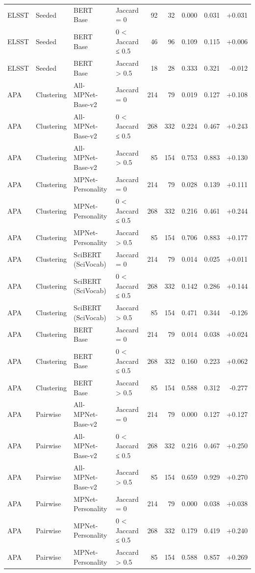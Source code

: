 \begin{table}[ht]
\begin{tabular}{llllrrrrr}
ELSST & Seeded & BERT Base & Jaccard = 0 & 92 & 32 & 0.000 & 0.031 & +0.031 \\
ELSST & Seeded & BERT Base & 0 < Jaccard ≤ 0.5 & 46 & 96 & 0.109 & 0.115 & +0.006 \\
ELSST & Seeded & BERT Base & Jaccard > 0.5 & 18 & 28 & 0.333 & 0.321 & -0.012 \\
APA & Clustering & All-MPNet-Base-v2 & Jaccard = 0 & 214 & 79 & 0.019 & 0.127 & +0.108 \\
APA & Clustering & All-MPNet-Base-v2 & 0 < Jaccard ≤ 0.5 & 268 & 332 & 0.224 & 0.467 & +0.243 \\
APA & Clustering & All-MPNet-Base-v2 & Jaccard > 0.5 & 85 & 154 & 0.753 & 0.883 & +0.130 \\
APA & Clustering & MPNet-Personality & Jaccard = 0 & 214 & 79 & 0.028 & 0.139 & +0.111 \\
APA & Clustering & MPNet-Personality & 0 < Jaccard ≤ 0.5 & 268 & 332 & 0.216 & 0.461 & +0.244 \\
APA & Clustering & MPNet-Personality & Jaccard > 0.5 & 85 & 154 & 0.706 & 0.883 & +0.177 \\
APA & Clustering & SciBERT (SciVocab) & Jaccard = 0 & 214 & 79 & 0.014 & 0.025 & +0.011 \\
APA & Clustering & SciBERT (SciVocab) & 0 < Jaccard ≤ 0.5 & 268 & 332 & 0.142 & 0.286 & +0.144 \\
APA & Clustering & SciBERT (SciVocab) & Jaccard > 0.5 & 85 & 154 & 0.471 & 0.344 & -0.126 \\
APA & Clustering & BERT Base & Jaccard = 0 & 214 & 79 & 0.014 & 0.038 & +0.024 \\
APA & Clustering & BERT Base & 0 < Jaccard ≤ 0.5 & 268 & 332 & 0.160 & 0.223 & +0.062 \\
APA & Clustering & BERT Base & Jaccard > 0.5 & 85 & 154 & 0.588 & 0.312 & -0.277 \\
APA & Pairwise & All-MPNet-Base-v2 & Jaccard = 0 & 214 & 79 & 0.000 & 0.127 & +0.127 \\
APA & Pairwise & All-MPNet-Base-v2 & 0 < Jaccard ≤ 0.5 & 268 & 332 & 0.216 & 0.467 & +0.250 \\
APA & Pairwise & All-MPNet-Base-v2 & Jaccard > 0.5 & 85 & 154 & 0.659 & 0.929 & +0.270 \\
APA & Pairwise & MPNet-Personality & Jaccard = 0 & 214 & 79 & 0.000 & 0.038 & +0.038 \\
APA & Pairwise & MPNet-Personality & 0 < Jaccard ≤ 0.5 & 268 & 332 & 0.179 & 0.419 & +0.240 \\
APA & Pairwise & MPNet-Personality & Jaccard > 0.5 & 85 & 154 & 0.588 & 0.857 & +0.269 \\

\end{tabular}
\end{table}
